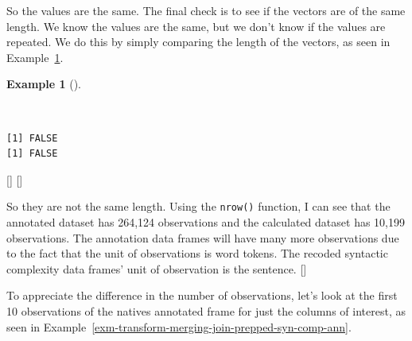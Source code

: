 \documentclass[
  letterpaper,
  krantz1]{latex/krantz-mod}
\newenvironment{Shaded}{\begin{snugshade}}{\end{snugshade}}
\newcommand{\CommentTok}[1]{\textcolor[rgb]{0.00,0.00,0.00}{\textit{#1}}}
\newcommand{\FunctionTok}[1]{\textcolor[rgb]{0.00,0.00,0.00}{#1}}
\newcommand{\NormalTok}[1]{\textcolor[rgb]{0.00,0.00,0.00}{#1}}
\newcommand{\SpecialCharTok}[1]{\textcolor[rgb]{0.00,0.00,0.00}{#1}}
\newcommand{\cindex}[1]{%
  \StrSubstitute{#1}{_}{\_}[\temp]%
  \index{\temp}%
}
\theoremstyle{definition}
\theoremstyle{definition}
\newtheorem{example}{Example}[chapter]
\theoremstyle{remark}
\begin{document}
So the values are the same. The final check is to see if the vectors are
of the same length. We know the values are the same, but we don't know
if the values are repeated. We do this by simply comparing the length of
the vectors, as seen in
Example~\ref{exm-transform-merging-join-prepped-syn-comp-length}.

\begin{example}[]\protect\hypertarget{exm-transform-merging-join-prepped-syn-comp-length}{}\label{exm-transform-merging-join-prepped-syn-comp-length}

~

\begin{Shaded}
\end{Shaded}

\begin{verbatim}
[1] FALSE
[1] FALSE
\end{verbatim}

\cindex{length()}\cindex{==}

\end{example}

So they are not the same length. Using the \texttt{nrow()} function, I
can see that the annotated dataset has 264,124 observations and the
calculated dataset has 10,199 observations. The annotation data frames
will have many more observations due to the fact that the unit of
observations is word tokens. The recoded syntactic complexity data
frames' unit of observation is the sentence.\cindex{nrow()}

To appreciate the difference in the number of observations, let's look
at the first 10 observations of the natives annotated frame for just the
columns of interest, as seen in
Example~\ref{exm-transform-merging-join-prepped-syn-comp-ann}.
\end{document}
